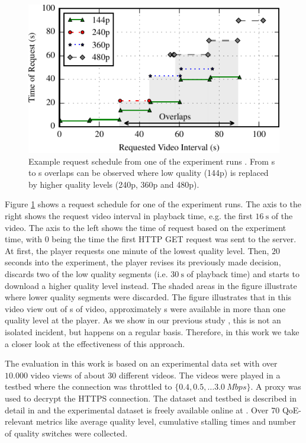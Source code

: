 \begin{figure}[t]
\centering
\includegraphics[width=\columnwidth]{figs/eg_request_schedule}%
\caption{Example request schedule from one of the experiment runs \cite{sieber16sacrificing}. From \unit[30]{s} to \unit[90]{s} overlaps can be observed where low quality (144p) is replaced by higher quality levels (240p, 360p and 480p).}
\label{fig:request_schedule}%
\end{figure}

Figure \ref{fig:request_schedule} shows a request schedule for one of the experiment runs.
The axis to the right shows the request video interval in playback time, e.g. the first $\SI{16}{\second}$ of the video.
The axis to the left shows the time of request based on the experiment time, with $0$ being the time the first HTTP GET request was sent to the server.
At first, the player requests one minute of the lowest quality level.
Then, ${20}$ seconds into the experiment, the player revises its previously made decision, discards two of the low quality segments (i.e. $\SI{30}{\second}$ of playback time) and starts to download a higher quality level instead.
The shaded areas in the figure illustrate where lower quality segments were discarded.
The figure illustrates that in this video view out of \unit[105]{s} of video, approximately \unit[60]{s} were available in more than one quality level at the player. 
As we show in our previous study \cite{sieber16sacrificing}, this is not an isolated incident, but happens on a regular basis. 
Therefore, in this work we take a closer look at the effectiveness of this approach.

The evaluation in this work is based on an experimental data set with over $10.000$ video views of about $30$ different videos.
The videos were played in a testbed where the connection was throttled to $\{0.4, 0.5, \dots \SI{3.0}{Mbps}\}$.
A proxy was used to decrypt the HTTPS connection.
The dataset and testbed is described in detail in \cite{sieber16sacrificing,sieber15costaggressive} and the experimental dataset is freely available online at \cite{traces}. 
Over 70 QoE-relevant metrics like average quality level, cumulative stalling times and number of quality switches were collected.

